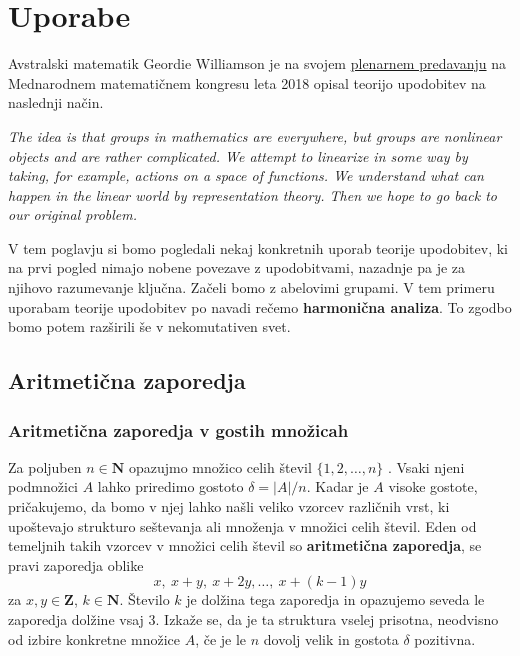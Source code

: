 \documentclass[11pt]{book}
\def\NN{\mathbf{N}}
\def\ZZ{\mathbf{Z}}
\def\definicija{\color{rdeca}\bf}
\theoremstyle{definition}
\theoremstyle{zgled}
\theoremstyle{zgledbrezstevilke}
\theoremstyle{odprtproblem}
\theoremstyle{domacanaloga}
\theoremstyle{izrek}
\begin{document}
\chapter{Uporabe}

Avstralski matematik Geordie Williamson je na svojem \href{https://www.youtube.com/watch?v=-3q6C558yog}{plenarnem predavanju} na Mednarodnem matematičnem kongresu leta 2018 opisal teorijo upodobitev na naslednji način.

\smallskip 

\emph{The idea is that groups in mathematics are everywhere, but groups are nonlinear objects and are rather complicated. We attempt to linearize in some way by taking, for example, actions on a space of functions. We understand what can happen in the linear world by representation theory. Then we hope to go back to our original problem.}

\smallskip

V tem poglavju si bomo pogledali nekaj konkretnih uporab teorije upodobitev, ki na prvi pogled nimajo nobene povezave z upodobitvami, nazadnje pa je za njihovo razumevanje ključna. Začeli bomo z abelovimi grupami. V tem primeru uporabam teorije upodobitev po navadi rečemo {\definicija harmonična analiza}. To zgodbo bomo potem razširili še v nekomutativen svet.

\section{Aritmetična zaporedja}

\subsection{Aritmetična zaporedja v gostih množicah}

Za poljuben $n \in \NN$ opazujmo množico celih števil $\{ 1, 2, \dots, n \}$ . Vsaki njeni podmnožici $A$ lahko priredimo gostoto $\delta = |A|/n$. Kadar je $A$ visoke gostote, pričakujemo, da bomo v njej lahko našli veliko vzorcev različnih vrst, ki upoštevajo strukturo seštevanja ali množenja v množici celih števil. Eden od temeljnih takih vzorcev v množici celih števil so {\definicija aritmetična zaporedja}, se pravi zaporedja oblike
\[
    x, \ x+y, \ x+2y, \dots, \ x + (k-1)y
\]
za $x,y \in \ZZ$, $k \in \NN$. Število $k$ je dolžina tega zaporedja in opazujemo seveda le zaporedja dolžine vsaj $3$. Izkaže se, da je ta struktura vselej prisotna, neodvisno od izbire konkretne množice $A$, če je le $n$ dovolj velik in gostota $\delta$ pozitivna.
\end{document}
